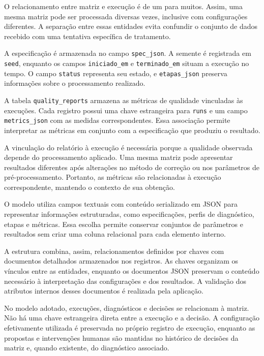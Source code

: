 O relacionamento entre matriz e execução é de um para muitos. Assim, uma mesma matriz pode ser processada diversas vezes, inclusive com configurações diferentes. A separação entre essas entidades evita confundir o conjunto de dados recebido com uma tentativa específica de tratamento.

A especificação é armazenada no campo \texttt{spec\_json}. A semente é registrada em \texttt{seed}, enquanto os campos \texttt{iniciado\_em} e \texttt{terminado\_em} situam a execução no tempo. O campo \texttt{status} representa seu estado, e \texttt{etapas\_json} preserva informações sobre o processamento realizado.

A tabela \texttt{quality\_reports} armazena as métricas de qualidade vinculadas às execuções. Cada registro possui uma chave estrangeira para \texttt{runs} e um campo \texttt{metrics\_json} com as medidas correspondentes. Essa associação permite interpretar as métricas em conjunto com a especificação que produziu o resultado.

A vinculação do relatório à execução é necessária porque a qualidade observada depende do processamento aplicado. Uma mesma matriz pode apresentar resultados diferentes após alterações no método de correção ou nos parâmetros de pré-processamento. Portanto, as métricas são relacionadas à execução correspondente, mantendo o contexto de sua obtenção.

O modelo utiliza campos textuais com conteúdo serializado em JSON para representar informações estruturadas, como especificações, perfis de diagnóstico, etapas e métricas. Essa escolha permite conservar conjuntos de parâmetros e resultados sem criar uma coluna relacional para cada elemento interno.

A estrutura combina, assim, relacionamentos definidos por chaves com documentos detalhados armazenados nos registros. As chaves organizam os vínculos entre as entidades, enquanto os documentos JSON preservam o conteúdo necessário à interpretação das configurações e dos resultados. A validação dos atributos internos desses documentos é realizada pela aplicação.

No modelo adotado, execuções, diagnósticos e decisões se relacionam à matriz. Não há uma chave estrangeira direta entre a execução e a decisão. A configuração efetivamente utilizada é preservada no próprio registro de execução, enquanto as propostas e intervenções humanas são mantidas no histórico de decisões da matriz e, quando existente, do diagnóstico associado.

